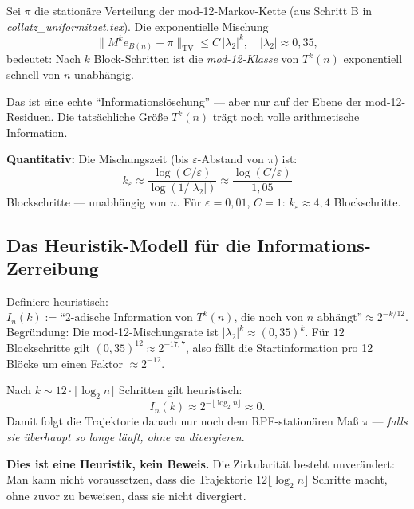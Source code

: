 \documentclass[12pt,a4paper]{article}
\newcommand{\TV}{\mathrm{TV}}
\begin{document}
\begin{tcolorbox}[kernidee, title={Wie Mischung die Startwert-Information ``zerreibt''}]
Sei $\pi$ die stationäre Verteilung der mod-12-Markov-Kette (aus Schritt B
in \textit{collatz\_uniformitaet.tex}). Die exponentielle Mischung
\[
  \bigl\|M^k e_{B(n)} - \pi\bigr\|_{\TV} \leq C\,|\lambda_2|^k,
  \quad |\lambda_2| \approx 0{,}35,
\]
bedeutet: Nach $k$ Block-Schritten ist die \emph{mod-12-Klasse} von $T^k(n)$
exponentiell schnell von $n$ unabhängig.

\medskip
Das ist eine echte ``Informationslöschung'' --- aber nur auf der Ebene der
mod-12-Residuen. Die tatsächliche Größe $T^k(n)$ trägt noch volle arithmetische
Information.

\medskip
\textbf{Quantitativ:} Die Mischungszeit (bis $\varepsilon$-Abstand von $\pi$)
ist:
\[
  k_\varepsilon \approx \frac{\log(C/\varepsilon)}{\log(1/|\lambda_2|)}
  \approx \frac{\log(C/\varepsilon)}{1{,}05}
\]
Blockschritte --- unabhängig von $n$. Für $\varepsilon = 0{,}01$, $C = 1$:
$k_\varepsilon \approx 4{,}4$ Blockschritte.
\end{tcolorbox}

\subsection{Das Heuristik-Modell für die Informations-Zerreibung}

\begin{tcolorbox}[warnung, title={Heuristik: exponentieller Informationsabfall}]
Definiere heuristisch:
\[
  I_n(k) := \text{``2-adische Information von } T^k(n)\text{, die noch von } n \text{ abhängt''}
  \approx 2^{-k/12}.
\]
Begründung: Die mod-12-Mischungsrate ist $|\lambda_2|^k \approx (0{,}35)^k$.
Für $12$ Blockschritte gilt $(0{,}35)^{12} \approx 2^{-17{,}7}$, also fällt
die Startinformation pro 12 Blöcke um einen Faktor $\approx 2^{-12}$.

\medskip
Nach $k \sim 12 \cdot \lfloor\log_2 n\rfloor$ Schritten gilt heuristisch:
\[
  I_n(k) \approx 2^{-\lfloor\log_2 n\rfloor} \approx 0.
\]
Damit folgt die Trajektorie danach nur noch dem RPF-stationären Maß $\pi$
--- \emph{falls sie überhaupt so lange läuft, ohne zu divergieren}.

\medskip
\textbf{Dies ist eine Heuristik, kein Beweis.} Die Zirkularität besteht
unverändert: Man kann nicht voraussetzen, dass die Trajektorie $12\lfloor\log_2 n\rfloor$
Schritte macht, ohne zuvor zu beweisen, dass sie nicht divergiert.
\end{tcolorbox}
\end{document}
